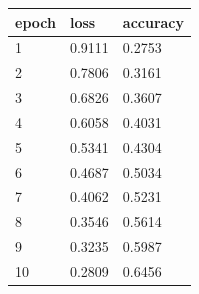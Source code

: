 \begin{tabular}{lll}
\hline
epoch & loss & accuracy \\
\hline
1 & 0.9111 & 0.2753 \\
2 & 0.7806 & 0.3161 \\
3 & 0.6826 & 0.3607 \\
4 & 0.6058 & 0.4031 \\
5 & 0.5341 & 0.4304 \\
6 & 0.4687 & 0.5034 \\
7 & 0.4062 & 0.5231 \\
8 & 0.3546 & 0.5614 \\
9 & 0.3235 & 0.5987 \\
10 & 0.2809 & 0.6456 \\
\hline
\end{tabular}
